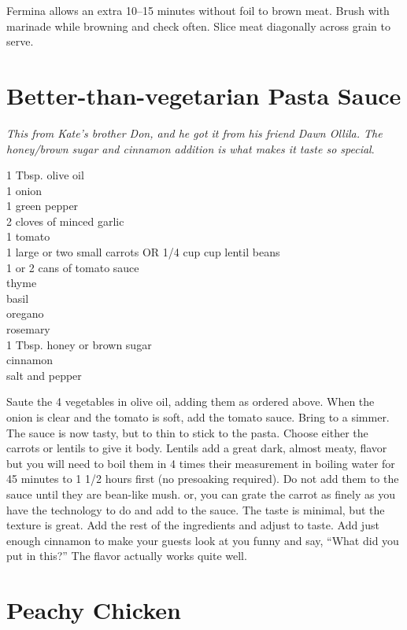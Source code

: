 Fermina allows an extra 10--15 minutes without foil to brown meat.  Brush with
marinade while browning and check often.  Slice meat diagonally across grain to
serve.

\section{Better-than-vegetarian Pasta Sauce}

\textit{This from Kate's brother Don, and he got it from his friend Dawn
Ollila. The honey/brown sugar and cinnamon addition is what makes it taste so
special}.
\begin{ingredients}
1 Tbsp. olive oil \\
1 onion \\
1 green pepper \\
2 cloves of minced garlic \\
1 tomato\\
1 large or two small carrots OR 1/4 cup cup lentil beans \\
1 or 2 cans of tomato sauce \\
thyme \\
basil \\
oregano \\
rosemary \\
1 Tbsp. honey or brown sugar \\
cinnamon \\
salt and pepper \\
\end{ingredients}
Saute the 4 vegetables in olive oil, adding them as ordered above. When the
onion is clear and the tomato is soft, add the tomato sauce.  Bring to a
simmer. The sauce is now tasty, but to thin to stick to the pasta.
Choose either the carrots or lentils to give it body. Lentils add a great dark,
almost meaty, flavor but you will need to boil them in 4 times their
measurement in boiling water for 45 minutes to 1 1/2 hours first (no presoaking
required). Do not add them to the sauce until they are bean-like mush. or, you
can grate the carrot as finely as you have the technology to do and add to
the sauce. The taste is minimal, but the texture is great. Add the rest of the
ingredients and adjust to taste. Add just enough cinnamon to make your guests
look at you funny and say, ``What did you put in this?'' The flavor actually
works quite well.

\section{Peachy Chicken}

